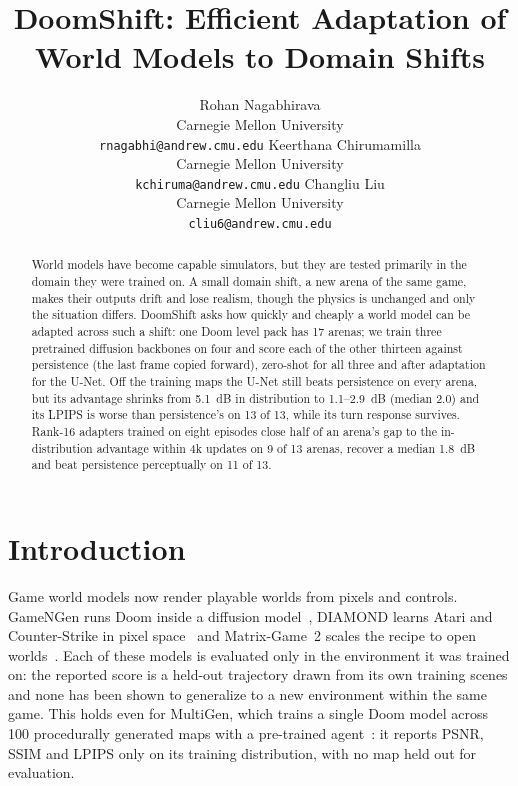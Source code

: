 \documentclass{article}
\title{DoomShift: Efficient Adaptation of World Models to Domain Shifts}
\author{
  Rohan Nagabhirava\\
  Carnegie Mellon University\\
  \texttt{rnagabhi@andrew.cmu.edu}
  \And
  Keerthana Chirumamilla\\
  Carnegie Mellon University\\
  \texttt{kchiruma@andrew.cmu.edu}
  \And
  Changliu Liu\\
  Carnegie Mellon University\\
  \texttt{cliu6@andrew.cmu.edu}
}
\begin{document}
\maketitle


\begin{abstract}
World models have become capable simulators, but they are tested primarily in the domain they were trained on.
A small domain shift, a new arena of the same game, makes their outputs drift and lose realism, though the physics is unchanged and only the situation differs.
DoomShift asks how quickly and cheaply a world model can be adapted across such a shift: one Doom level pack has 17 arenas; we train three pretrained diffusion backbones on four and score each of the other thirteen against persistence (the last frame copied forward), zero-shot for all three and after adaptation for the U-Net.
Off the training maps the U-Net still beats persistence on every arena, but its advantage shrinks from 5.1~dB in distribution to 1.1--2.9~dB (median 2.0) and its LPIPS is worse than persistence's on 13 of 13, while its turn response survives.
Rank-16 adapters trained on eight episodes close half of an arena's gap to the in-distribution advantage within 4k updates on 9 of 13 arenas, recover a median 1.8~dB and beat persistence perceptually on 11 of 13.
\end{abstract}



\section{Introduction}
\label{sec:intro}

Game world models now render playable worlds from pixels and controls.
GameNGen runs Doom inside a diffusion model~\citep{valevski2024gamengen}, DIAMOND learns Atari and Counter-Strike in pixel space~\citep{alonso2024diamond} and Matrix-Game~2 scales the recipe to open worlds~\citep{he2025matrixgame2}.
Each of these models is evaluated only in the environment it was trained on: the reported score is a held-out trajectory drawn from its own training scenes and none has been shown to generalize to a new environment within the same game.
This holds even for MultiGen, which trains a single Doom model across 100 procedurally generated maps with a pre-trained agent~\citep{po2026multigen}: it reports PSNR, SSIM and LPIPS only on its training distribution, with no map held out for evaluation.
\end{document}
